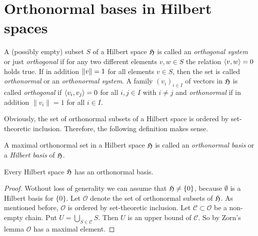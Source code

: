 %
\section{Orthonormal bases in Hilbert spaces}
\label{sec:orthonormal-baes-hilbert-spaces}

\begin{definition}
  A (possibly empty) subset $S$ of a Hilbert space $\mathfrak{H}$ is called
  an \emph{orthogonal system} or just \emph{orthogonal} if for any  two different elements $v,w \in S$ the relation 
  $\langle v,w \rangle = 0$ holds true. If in addition $\left\|v\right\|=1$ for all elements $v \in S$,
  then the set is called \emph{orthonormal} or an \emph{orthonormal system}.  
  A family $(v_i)_{i\in I}$ of vectors in $\mathfrak{H}$ is called \emph{orthogonal} if 
  $\langle v_i,v_j \rangle = 0$ for all  $i,j\in I$ with $i\neq j$ and  \emph{orthonormal} 
  if in addition $\|v_i\| =1$ for all $i\in I$. 
\end{definition}

\para
  Obviously, the set of orthonormal subsets of a Hilbert space is ordered by set-theoretic inclusion. 
  Therefore, the following definition makes sense. 

\begin{definition}
  A maximal orthonormal set in a Hilbert space $\mathfrak{H}$ is called an \emph{orthonormal basis}
  or a \emph{Hilbert basis} of $\mathfrak{H}$.      
\end{definition}

\begin{proposition}
  Every  Hilbert space $\mathfrak{H}$ has an orthonormal basis. 
\end{proposition}

\begin{proof}
  Wothout loss of generality we can assume that $\mathfrak{H} \neq \{ 0\}$, because 
  $\emptyset$ is a Hilbert basis for $\{ 0 \}$. 
  Let $\mathscr{O}$ denote the set of orthonormal subsets of $\mathfrak{H}$. As mentioned before, $\mathscr{O}$ 
  is ordered by set-theoretic inclusion. Let $\mathscr{C} \subset \mathscr{O}$ be a non-empty chain. 
  Put $U  = \bigcup_{S\in \mathscr{C}} S$. Then  $U$ is an upper bound of $\mathscr{C}$.
  So by Zorn's lemma $\mathscr{O}$ has a maximal element.   
\end{proof}

